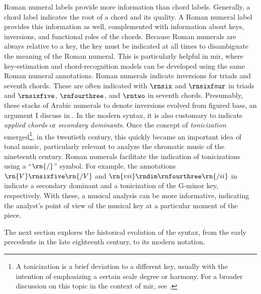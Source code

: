 

Roman numeral labels provide more information than chord
labels. Generally, a chord label indicates the root of a
chord and its quality. A Roman numeral label provides this
information as well, complemented with information about
keys, inversions, and functional roles of the chords.
Because Roman numerals are always relative to a key, the key
must be indicated at all times to disambiguate the meaning
of the Roman numeral. This is particularly helpful in
\gls{mir}, where key-estimation and chord-recognition models
can be developed using the same Roman numeral annotations.
Roman numerals indicate inversions for triads and seventh
chords. These are often indicated with $\rnsix$ and
$\rnsixfour$ in triads and $\rnsixfive$, $\rnfourthree$, and
$\rntwo$ in seventh chords. Presumably, these stacks of
Arabic numerals to denote inversions evolved from figured
bass, an argument I discuss in
. In the modern
syntax, it is also customary to indicate \emph{applied
chords} or \emph{secondary dominants}. Once the concept of
\emph{tonicization} emerged\footnote{A tonicization is a
brief deviation to a different key, usually with the
intention of emphasizing a certain scale degree or harmony.
For a broader discussion on this topic in the context of
\gls{mir}, see \textcite{napoleslopez2020local}. }, in the
twentieth century, this quickly became an important idea of
tonal music, particularly relevant to analyze the chromatic
music of the nineteenth century. Roman numerals facilitate
the indication of tonicizations using a ``$\rn{/}$'' symbol.
For example, the annotations $\rn{V}\rnsixfive\rn{/V}$ and
$\rn{vii}\rndim\rnfourthree\rn{/ii}$ in 
indicate a secondary dominant and a tonicization of the
G-minor key, respectively. With these, a musical analysis
can be more informative, indicating the analyst's point of
view of the musical key at a particular moment of the piece.

The next section explores the historical evolution of the
syntax, from the early precedents in the late eighteenth
century, to its modern notation.

